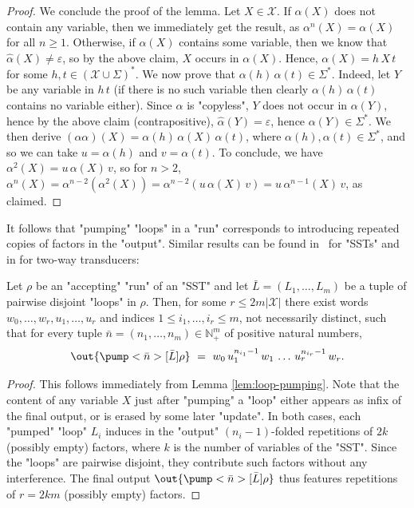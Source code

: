 \documentclass{theoretics}
\newcommand{\var}{\mathcal{X}}
\begin{document}
\begin{proof}
      We conclude the proof of the lemma. Let $X\in \var$. 
      If $\alpha(X)$ does not contain any variable, then
      we immediately get the result, as
      $\alpha^n(X) = \alpha(X)$ for all $n\geq 1$. 
      Otherwise, if $\alpha(X)$ contains some variable, then
      we know that $\hat\alpha(X)\neq\varepsilon$, 
      so by the above claim, $X$ occurs in $\alpha(X)$. 
      Hence, $\alpha(X) = h \, X \,t$ 
      for some $h,t\in(\var\cup\Sigma)^*$. 
      We now prove that
      $\alpha(h)\, \alpha(t)\in\Sigma^*$. 
      Indeed, let $Y$ be any variable in $h\,t$ 
      (if there is no such variable then clearly 
       $\alpha(h)\, \alpha(t)$ contains no variable either). 
      Since $\alpha$ is "copyless", 
      $Y$ does not occur in $\alpha(Y)$, 
      hence by the above claim (contrapositive), 
      $\hat\alpha(Y)=\varepsilon$,
      hence $\alpha(Y)\in\Sigma^*$. 
      We then derive
      $(\alpha\alpha)(X) = \alpha(h) \, \alpha(X) \, \alpha(t)$,
      where $\alpha(h),\alpha(t)\in\Sigma^*$, and so we can take 
      $u = \alpha(h)$ and $v=\alpha(t)$. 
      To conclude, we have 
      $\alpha^2(X) = u \, \alpha(X) \,v$, so for $n>2$, 
      $\alpha^n(X) = \alpha^{n-2}(\alpha^2(X)) = 
       \alpha^{n-2}(u \, \alpha(X) \,v) = u \, \alpha^{n-1}(X) \,v$,
      as claimed. 
\end{proof}



It follows that "pumping" "loops" in a "run" corresponds 
to introducing repeated copies of factors in the "output". 
Similar results can be found
in~\cite{equivalence-finite-valued} for "SSTs" 
and in \cite{rozoy1986,GaetanPhD} for two-way transducers:


\begin{corollary}\label{cor:loop-pumping}
Let $\rho$ be an "accepting" "run" of an "SST" and let $\bar L = (L_1,\dots,L_m)$ 
be a tuple of pairwise disjoint "loops" in $\rho$.
Then, for some $r \le 2m|\var|$ there exist words $w_0,\dots,w_r,u_1,\dots,u_r$ 
and indices $1\le i_1,\dots,i_r\le m$, not necessarily distinct, such that 
for every tuple $\bar n = (n_1,\dots,n_m) \in \mathbb{N}^m_+$ of positive natural numbers, 
\[
  \out{\pump<\bar n>[\bar L]{\rho}}
  ~=~
  w_0 \, u_1^{n_{i_1}-1} \, w_1 \, \dots \, u_r^{n_{i_r}-1} \, w_r.
\]
\end{corollary}

\begin{proof}
This follows immediately from Lemma \ref{lem:loop-pumping}.
Note that the content of any variable $X$ just after
"pumping" a "loop" either appears as infix of the final output, 
or is erased by some later "update". 
In both cases, each "pumped" "loop" $L_i$ induces in the "output" 
$(n_i-1)$-folded repetitions of $2k$ (possibly empty) factors, 
where $k$ is the number of variables of the "SST".
Since the "loops" are pairwise disjoint, they contribute such factors
without any interference.
The final output $\out{\pump<\bar n>[\bar L]{\rho}}$ 
thus features repetitions of $r = 2km$ (possibly empty) factors.
\end{proof}
\end{document}
